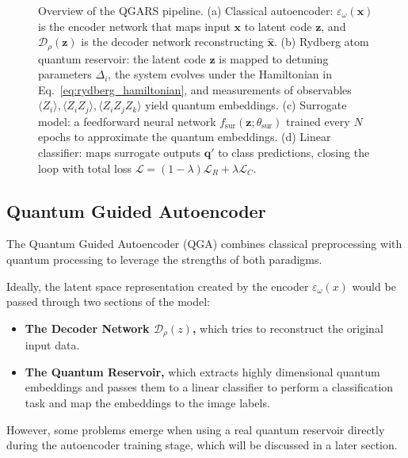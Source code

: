 \documentclass[conference]{IEEEtran}
\begin{document}
\begin{figure}[!t]
    \centering
    \label{fig:qgars_pipeline}
    \caption{
    Overview of the QGARS pipeline. (a) Classical autoencoder: $\varepsilon_{\omega}(\mathbf{x})$ is the encoder network that maps input $\mathbf{x}$ to latent code $\mathbf{z}$, and $\mathcal{D}_{\rho}(\mathbf{z})$ is the decoder network reconstructing $\hat{\mathbf{x}}$. (b) Rydberg atom quantum reservoir: the latent code $\mathbf{z}$ is mapped to detuning parameters $\Delta_i$, the system evolves under the Hamiltonian in Eq.~\eqref{eq:rydberg_hamiltonian}, and measurements of observables $\langle Z_i\rangle,\langle Z_iZ_j\rangle,\langle Z_iZ_jZ_k\rangle$ yield quantum embeddings. (c) Surrogate model: a feedforward neural network $f_{\mathrm{sur}}(\mathbf{z};\theta_{\mathrm{sur}})$ trained every $N$ epochs to approximate the quantum embeddings. (d) Linear classifier: maps surrogate outputs $\mathbf{q}'$ to class predictions, closing the loop with total loss $\mathcal{L}=(1-\lambda)\mathcal{L}_R+\lambda\mathcal{L}_C$.
    }
\end{figure}

\subsection{Quantum Guided Autoencoder}
The Quantum Guided Autoencoder (QGA) combines classical 
preprocessing with quantum processing to leverage 
the strengths of both paradigms.

Ideally, the latent space representation created by the encoder \(\varepsilon_\omega(x)\)
would be passed through two sections of the model:
\begin{itemize}
    \item \textbf{The Decoder Network \(\mathcal{D}_\rho(z)\),}
    which tries to reconstruct the original input data.
    \item \textbf{The Quantum Reservoir,}
    which extracts highly dimensional quantum embeddings and
    passes them to a linear classifier to perform a classification
    task and map the embeddings to the image labels.
\end{itemize}
However, some problems emerge when using a real quantum reservoir directly during the autoencoder training stage, which will be discussed in a later section.
\end{document}
